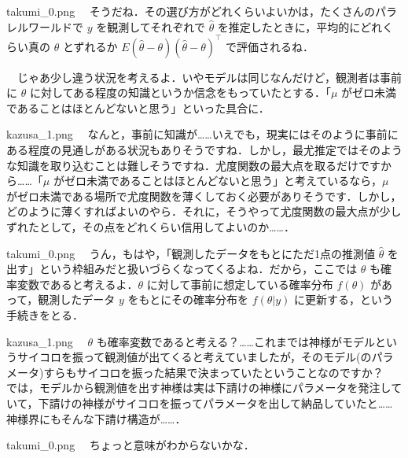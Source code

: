\documentclass[b5paper,xelatex,ja=standard,10pt]{bxjsarticle}
\begin{document}
\begin{SERIFU}[colback=PaleGold]{takumi_0.png}
　そうだね．その選び方がどれくらいよいかは，たくさんのパラレルワールドで $y$ を観測してそれぞれで $\hat{\theta}$ を推定したときに，平均的にどれくらい真の $\theta$ とずれるか $E(\hat{\theta} - \theta)(\hat{\theta} - \theta)^\top$ で評価されるね．

　じゃあ少し違う状況を考えるよ．いやモデルは同じなんだけど，観測者は事前に $\theta$ に対してある程度の知識というか信念をもっていたとする．「$\mu$ がゼロ未満であることはほとんどないと思う」といった具合に．
\end{SERIFU}


\begin{SERIFU}[colback=PaleIris]{kazusa_1.png}
　なんと，事前に知識が……いえでも，現実にはそのように事前にある程度の見通しがある状況もありそうですね．しかし，最尤推定ではそのような知識を取り込むことは難しそうですね．尤度関数の最大点を取るだけですから……「$\mu$ がゼロ未満であることはほとんどないと思う」と考えているなら，$\mu$ がゼロ未満である場所で尤度関数を薄くしておく必要がありそうです．しかし，どのように薄くすればよいのやら．それに，そうやって尤度関数の最大点が少しずれたとして，その点をどれくらい信用してよいのか……．
\end{SERIFU}


\begin{SERIFU}[colback=PaleGold]{takumi_0.png}
　うん，もはや，「観測したデータをもとにただ1点の推測値 $\hat{\theta}$ を出す」という枠組みだと扱いづらくなってくるよね．だから，ここでは $\theta$ も確率変数であると考えるよ．$\theta$ に対して事前に想定している確率分布 $f(\theta)$ があって，観測したデータ $y$ をもとにその確率分布を $f(\theta|y)$ に更新する，という手続きをとる．
\end{SERIFU}


\begin{SERIFU}[colback=PaleIris]{kazusa_1.png}
　$\theta$ も確率変数であると考える？……これまでは神様がモデルというサイコロを振って観測値が出てくると考えていましたが，そのモデル(のパラメータ)すらもサイコロを振った結果で決まっていたということなのですか？ \, では，モデルから観測値を出す神様は実は下請けの神様にパラメータを発注していて，下請けの神様がサイコロを振ってパラメータを出して納品していたと……神様界にもそんな下請け構造が……．
\end{SERIFU}


\begin{SERIFU}[colback=PaleGold]{takumi_0.png}
　ちょっと意味がわからないかな．
\end{SERIFU}
\end{document}
